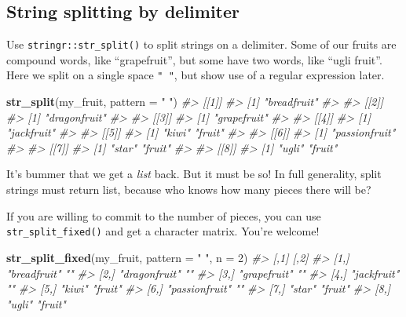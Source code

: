 \documentclass[
]{book}
\newenvironment{Shaded}{\begin{snugshade}}{\end{snugshade}}
\newcommand{\CommentTok}[1]{\textcolor[rgb]{0.56,0.35,0.01}{\textit{#1}}}
\newcommand{\DataTypeTok}[1]{\textcolor[rgb]{0.13,0.29,0.53}{#1}}
\newcommand{\DecValTok}[1]{\textcolor[rgb]{0.00,0.00,0.81}{#1}}
\newcommand{\KeywordTok}[1]{\textcolor[rgb]{0.13,0.29,0.53}{\textbf{#1}}}
\newcommand{\NormalTok}[1]{#1}
\newcommand{\StringTok}[1]{\textcolor[rgb]{0.31,0.60,0.02}{#1}}
\begin{document}
\hypertarget{string-splitting-by-delimiter}{%
\subsection{String splitting by delimiter}\label{string-splitting-by-delimiter}}

Use \texttt{stringr::str\_split()} to split strings on a delimiter. Some of our fruits are compound words, like ``grapefruit'', but some have two words, like ``ugli fruit''. Here we split on a single space \texttt{"\ "}, but show use of a regular expression later.

\begin{Shaded}
\begin{Highlighting}[]
\KeywordTok{str_split}\NormalTok{(my_fruit, }\DataTypeTok{pattern =} \StringTok{" "}\NormalTok{)}
\CommentTok{#> [[1]]}
\CommentTok{#> [1] "breadfruit"}
\CommentTok{#> }
\CommentTok{#> [[2]]}
\CommentTok{#> [1] "dragonfruit"}
\CommentTok{#> }
\CommentTok{#> [[3]]}
\CommentTok{#> [1] "grapefruit"}
\CommentTok{#> }
\CommentTok{#> [[4]]}
\CommentTok{#> [1] "jackfruit"}
\CommentTok{#> }
\CommentTok{#> [[5]]}
\CommentTok{#> [1] "kiwi"  "fruit"}
\CommentTok{#> }
\CommentTok{#> [[6]]}
\CommentTok{#> [1] "passionfruit"}
\CommentTok{#> }
\CommentTok{#> [[7]]}
\CommentTok{#> [1] "star"  "fruit"}
\CommentTok{#> }
\CommentTok{#> [[8]]}
\CommentTok{#> [1] "ugli"  "fruit"}
\end{Highlighting}
\end{Shaded}

It's bummer that we get a \emph{list} back. But it must be so! In full generality, split strings must return list, because who knows how many pieces there will be?

If you are willing to commit to the number of pieces, you can use \texttt{str\_split\_fixed()} and get a character matrix. You're welcome!

\begin{Shaded}
\begin{Highlighting}[]
\KeywordTok{str_split_fixed}\NormalTok{(my_fruit, }\DataTypeTok{pattern =} \StringTok{" "}\NormalTok{, }\DataTypeTok{n =} \DecValTok{2}\NormalTok{)}
\CommentTok{#>      [,1]           [,2]   }
\CommentTok{#> [1,] "breadfruit"   ""     }
\CommentTok{#> [2,] "dragonfruit"  ""     }
\CommentTok{#> [3,] "grapefruit"   ""     }
\CommentTok{#> [4,] "jackfruit"    ""     }
\CommentTok{#> [5,] "kiwi"         "fruit"}
\CommentTok{#> [6,] "passionfruit" ""     }
\CommentTok{#> [7,] "star"         "fruit"}
\CommentTok{#> [8,] "ugli"         "fruit"}
\end{Highlighting}
\end{Shaded}
\end{document}

